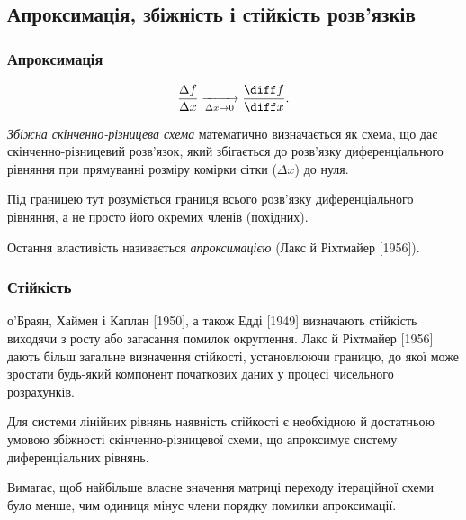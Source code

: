 \subsection{Апроксимація, збіжність і стійкість розв'язків}

\subsubsection{Апроксимація}

\begin{equation}
    \dfrac{\Delta f}{\Delta x} \xrightarrow[\Delta x \to 0]{} \dfrac{\diff f}{\diff x}.
\end{equation}

\begin{definition}
    \textit{Збіжна скінченно-різницева схема} математично визначається як схема, що дає скінченно-різницевий розв'язок, який збігається до розв'язку диференціального рівняння при прямуванні розміру комірки сітки ($\Delta x$) до нуля.
\end{definition}

\begin{remark}
    Під границею тут розуміється границя всього розв'язку диференціального рівняння, а не просто його окремих членів (похідних). 
\end{remark}

\begin{definition}
    Остання властивість називається \textit{апроксимацією} (Лакс й Ріхтмайер [1956]).
\end{definition}

\subsubsection{Стійкість}

о'Браян, Хаймен і Каплан [1950], а також Едді [1949] визначають стійкість виходячи з росту або загасання помилок округлення. Лакс й Ріхтмайер [1956] дають більш загальне визначення стійкості, установлюючи границю, до якої може зростати будь-який компонент початкових даних у процесі чисельного розрахунків.

\begin{theorem}[Лакса]
    Для системи лінійних рівнянь наявність стійкості є необхідною й достатньою умовою збіжності скінченно-різницевої схеми, що апроксимує систему диференціальних рівнянь.
\end{theorem}

\begin{theorem}
    Вимагає, щоб найбільше власне значення матриці переходу ітераційної схеми було менше, чим одиниця мінус члени порядку помилки апроксимації.
\end{theorem}

